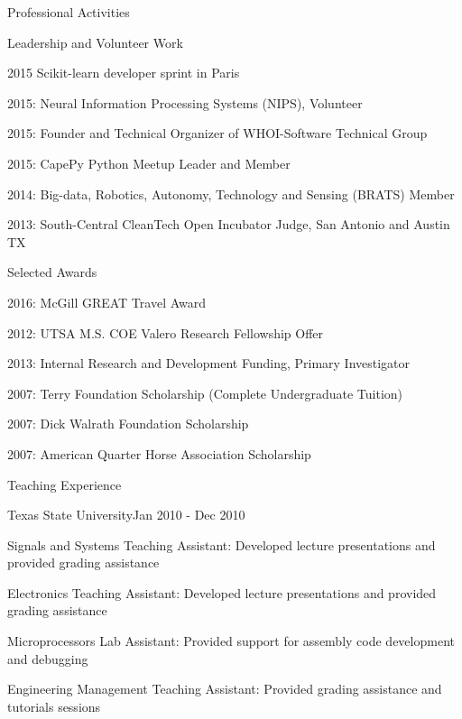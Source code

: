 \documentclass{resume} %
\begin{document}
\begin{rSection}{Professional Activities}
\begin{rSubsection}{Leadership and Volunteer Work}{}{}{}
\item{2015 Scikit-learn developer sprint in Paris}
\item{2015: Neural Information Processing Systems (NIPS), Volunteer}
\item{2015: Founder and Technical Organizer of WHOI-Software Technical Group}
\item{2015: CapePy Python Meetup Leader and Member}
\item{2014: Big-data, Robotics, Autonomy, Technology and Sensing (BRATS) Member}
\item{2013: South-Central CleanTech Open Incubator Judge, San Antonio and Austin TX}
\end{rSubsection}

\begin{rSubsection}{Selected Awards}{}{}{}
\item{2016: McGill GREAT Travel Award} 
\item{2012: UTSA M.S. COE Valero Research Fellowship Offer } 
\item{2013: Internal Research and Development Funding, Primary Investigator} 
\item{2007: Terry Foundation Scholarship (Complete Undergraduate Tuition)} 
\item{2007: Dick Walrath Foundation Scholarship} 
\item{2007: American Quarter Horse Association Scholarship} 
\end{rSubsection}
\end{rSection}
\begin{rSection}{Teaching Experience}
\begin{rSubsection}{Texas State University}{Jan 2010 - Dec 2010}{}{}
\item{Signals and Systems Teaching Assistant: Developed lecture presentations and provided grading assistance}
\item{Electronics Teaching Assistant: Developed lecture presentations and provided grading assistance}
\item{Microprocessors Lab Assistant: Provided support for assembly code development and debugging}
\item{Engineering Management Teaching Assistant: Provided grading assistance and tutorials sessions}
\end{rSubsection}
\end{rSection}
\end{document}
